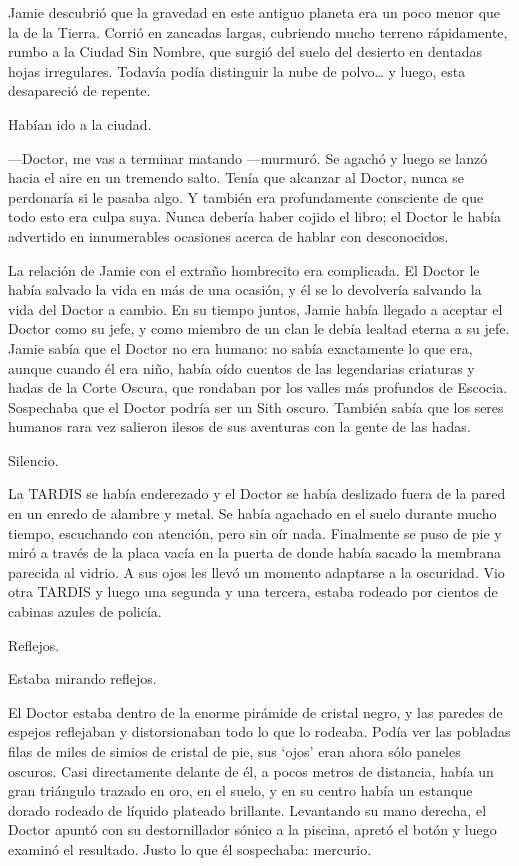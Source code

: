 Jamie descubrió que la gravedad en este antiguo planeta era un poco
menor que la de la Tierra. Corrió en zancadas largas, cubriendo mucho
terreno rápidamente, rumbo a la Ciudad Sin Nombre, que surgió del suelo
del desierto en dentadas hojas  irregulares. Todavía podía distinguir la
nube de polvo\ldots{} y luego, esta desapareció de repente.

Habían ido a la ciudad.

---Doctor, me vas a terminar matando ---murmuró. Se agachó y luego se
lanzó hacia el aire en un tremendo salto. Tenía que alcanzar al Doctor,
nunca se perdonaría si le pasaba algo. Y también era profundamente
consciente de que todo esto era culpa suya. Nunca debería haber
cojido el libro; el Doctor le había advertido en innumerables ocasiones
acerca de hablar con desconocidos.

La relación de Jamie con el extraño hombrecito era complicada. El Doctor
le había salvado la vida en más de una ocasión, y él se lo devolvería
salvando la vida del Doctor a cambio. En su tiempo juntos, Jamie había
llegado a aceptar el Doctor como su jefe, y como miembro de un clan le
debía lealtad eterna a su jefe. Jamie sabía que el Doctor no era humano:
no sabía exactamente lo que era, aunque cuando él era niño, había oído
cuentos de las legendarias criaturas y hadas de la Corte Oscura, que
rondaban por los valles más profundos de Escocia. Sospechaba que el
Doctor podría ser un Sith oscuro. También sabía que los seres humanos
rara vez salieron ilesos de sus aventuras con la gente de las hadas.

Silencio.

La TARDIS se había enderezado y el Doctor se había deslizado fuera de la
pared en un enredo de alambre y metal. Se había agachado en el suelo
durante mucho tiempo, escuchando con atención, pero sin oír nada.
Finalmente se puso de pie y miró a través de la placa vacía en la puerta
de donde había sacado la membrana parecida al vidrio. A sus ojos les
llevó un momento adaptarse a la oscuridad. Vio otra TARDIS y luego una
segunda y una tercera, estaba rodeado por cientos de cabinas azules de
policía.

Reflejos.

Estaba mirando reflejos.

El Doctor estaba dentro de la enorme pirámide de cristal negro, y las
paredes de espejos reflejaban y distorsionaban todo lo que lo rodeaba.
Podía ver las pobladas filas de miles de simios de cristal de pie, sus
`ojos' eran ahora sólo paneles oscuros. Casi directamente delante de él,
a pocos metros de distancia, había un gran triángulo trazado en oro, en
el suelo, y en su centro había un estanque dorado rodeado de líquido
plateado brillante. Levantando su mano derecha, el Doctor apuntó con su
destornillador sónico a la piscina, apretó el botón y luego examinó el
resultado. Justo lo que él sospechaba: mercurio.

